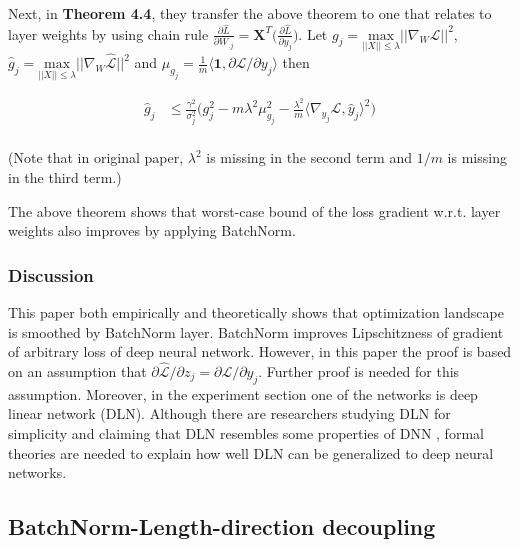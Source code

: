 \documentclass{article}
\begin{document}
Next, in \textbf{Theorem 4.4}, they transfer the above theorem to one that relates to layer weights by using chain rule $\frac{\partial\hat{L}}{\partial W_{.j}}=\textbf{X}^T\big(\frac{\partial\hat{L}}{\partial y_{j}}\big)$. Let $g_j=\underset{||X||\leq\lambda}{\mathrm{max}}\big|\big|\nabla_W\mathcal{L}\big|\big|^2$, $\hat{g}_j=\underset{||X||\leq\lambda}{\mathrm{max}}\big|\big|\nabla_W\hat{\mathcal{L}}\big|\big|^2$ and $\mu_{g_j}=\frac{1}{m}\langle\mathbf{1},\partial\mathcal{L}/\partial y_j\rangle$ then

\begin{align*}
	\hat{g}_j &\leq 
	\frac{\gamma^2}{\sigma_j^2}\Bigg(
	g_j^2 - m\lambda^2\mu^2_{g_j}-\frac{\lambda^2}{m}\langle\nabla_{y_j}\mathcal{L},\hat{y}_j\rangle^2
	\Bigg)\\
\end{align*}

(Note that in original paper, $\lambda^2$ is missing in the second term and $1/m$ is missing in the third term.)

The above theorem shows that worst-case bound of the loss gradient w.r.t. layer weights also improves by applying BatchNorm.

\subsubsection{Discussion}

This paper both empirically and theoretically shows that optimization landscape is smoothed by BatchNorm layer. BatchNorm improves Lipschitzness of gradient of arbitrary loss of deep neural network. However, in this paper the proof is based on an assumption that $\partial\hat{\mathcal{L}}/\partial z_j = \partial\mathcal{L}/\partial y_j$. Further proof is needed for this assumption. Moreover, in the experiment section one of the networks is deep linear network (DLN). Although there are researchers studying DLN for simplicity and claiming that DLN resembles some properties of DNN \cite{dln}, formal theories are needed to explain how well DLN can be generalized to deep neural networks.


\subsection{BatchNorm-Length-direction decoupling}
\end{document}
